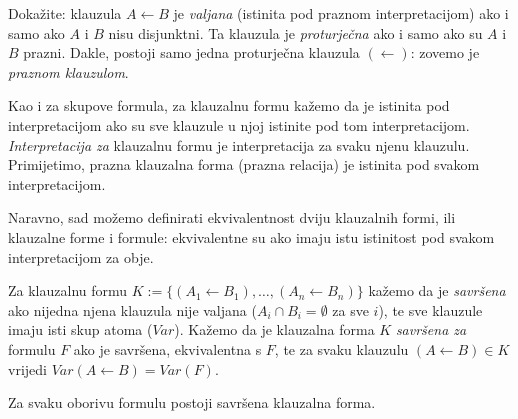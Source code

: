\begin{zadatak}\label{zad:singnf} Dokažite: klauzula $A\leftarrow B$ je \emph{valjana} (istinita pod praznom interpretacijom) ako i samo ako $A$ i $B$ nisu disjunktni. Ta klauzula je \emph{proturječna} ako i samo ako su $A$ i $B$ prazni. Dakle, postoji samo jedna proturječna klauzula $(\leftarrow)$: zovemo je \emph{praznom klauzulom}.
\end{zadatak}

\begin{definicija}
Kao i za skupove formula, za klauzalnu formu kažemo da je istinita pod interpretacijom ako su sve klauzule u njoj istinite pod tom interpretacijom. \emph{Interpretacija za} klauzalnu formu je interpretacija za svaku njenu klauzulu. Primijetimo, prazna klauzalna forma (prazna relacija) je istinita pod svakom interpretacijom.

Naravno, sad možemo definirati ekvivalentnost dviju klauzalnih formi, ili klauzalne forme i formule: ekvivalentne su ako imaju istu istinitost pod svakom interpretacijom za obje.

Za klauzalnu formu $K:=\{(A_1\leftarrow B_1),\ldots,(A_n\leftarrow B_n)\}$ kažemo da je \emph{savršena} ako nijedna njena klauzula nije valjana ($A_i\cap B_i=\emptyset$ za sve $i$), te sve klauzule imaju isti skup atoma ($Var$). Kažemo da je klauzalna forma $K$ \emph{savršena za} formulu $F$ ako je savršena, ekvivalentna s $F$, te za svaku klauzulu $(A\leftarrow B)\in K$ vrijedi $Var(A\leftarrow B)=Var(F)$.
\end{definicija}

\begin{teorem}
Za svaku oborivu formulu postoji savršena klauzalna forma.
\end{teorem}

